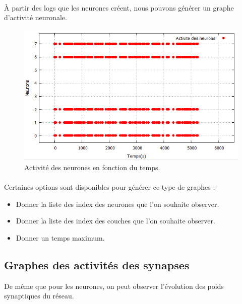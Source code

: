 \documentclass[a4paper,10pt]{article}
\begin{document}
\paragraph{}
À partir des logs que les neurones créent, nous pouvons générer un graphe d’activité neuronale. 

\begin{figure}[!h]
\includegraphics[scale=0.75,right]{image/neuronActivity.png}
\caption{Activité des neurones en fonction du temps.}
\end{figure}

\paragraph{}
Certaines options sont disponibles pour générer ce type de graphes :
\begin{itemize}
\item{Donner la liste des index des neurones que l’on souhaite observer.}
\item{Donner la liste des index des couches que l’on souhaite observer.}
\item{Donner un temps maximum.}
\end{itemize}

\subsection{Graphes des activités des synapses}

De même que pour les neurones, on peut observer l'évolution des poids synaptiques du réseau.
\end{document}
